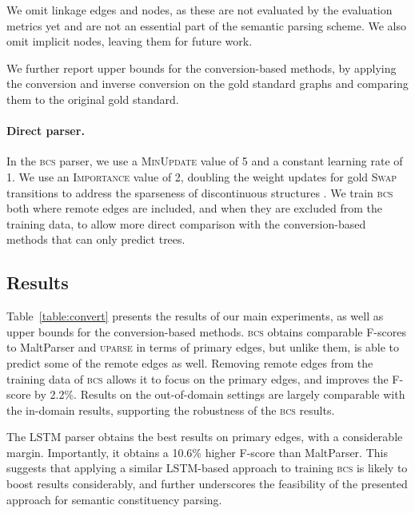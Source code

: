 \documentclass[11pt]{article}
\newcommand{\tabref}[1]{Table~\ref{#1}}
\begin{document}
We omit linkage edges and nodes, as these are not evaluated
by the evaluation metrics yet and are not an essential part of the
semantic parsing scheme.
We also omit implicit nodes, leaving them for future work.

We further report upper bounds for the conversion-based methods, by applying
the conversion and inverse conversion on the gold standard graphs and comparing
them to the original gold standard.

\paragraph{Direct parser.}
In the \textsc{bcs} parser, we use a \textsc{MinUpdate}
value of 5 and a constant learning rate of 1.
We use an \textsc{Importance} value of 2, doubling the weight updates for gold \textsc{Swap} transitions to address the sparseness of discontinuous structures \cite{maier2015discontinuous}.
We train \textsc{bcs} both where remote edges
are included, and when they are excluded from the training data, to allow
more direct comparison with the conversion-based methods that can only
predict trees.

\subsection{Results}

\tabref{table:convert} presents the results of our main experiments, as well as
upper bounds for the conversion-based methods.
\textsc{bcs} obtains comparable F-scores to MaltParser and \textsc{uparse}
in terms of primary edges, but unlike them, is able to predict some
of the remote edges as well. 
Removing remote edges from the training data of \textsc{bcs} allows it to focus
on the primary edges, and improves the F-score by 2.2\%. Results on
the out-of-domain settings are largely comparable with the in-domain
results, supporting the robustness of the \textsc{bcs} results.

The LSTM parser obtains the best results on primary edges, with a considerable margin.
Importantly, it obtains a 10.6\% higher F-score than MaltParser.
This suggests that applying a similar LSTM-based approach to training \textsc{bcs} is
likely to boost results considerably, and further underscores the feasibility
of the presented approach for semantic constituency parsing. 

\end{document}

